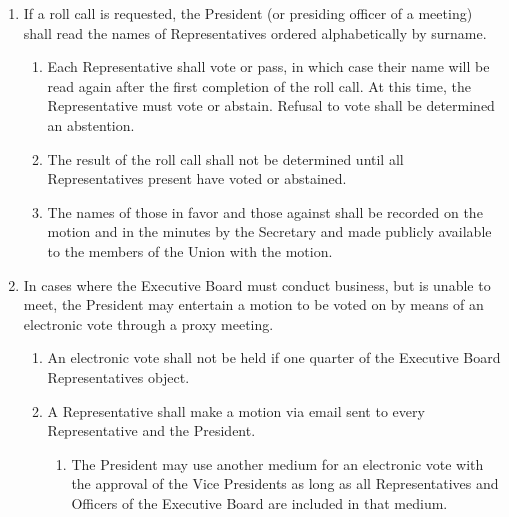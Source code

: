 \documentclass{uniondoc}
\begin{document}
\begin{enumerate}
  \begin{enumerate}
  \item Once all votes have been tallied, the President (or presiding officer of a meeting) will announce the result of the vote.
  \item In the case of a tie, the President (or presiding officer of a meeting) shall announce their vote, or their decision to abstain, and then the outcome of the vote.
  \item The vote count on any motion shall be recorded on the motion, and in the minutes by the Secretary, and it shall be made publicly available to the members of the Union with the motion.
  \end{enumerate}
\item If a roll call is requested, the President (or presiding officer of a meeting) shall read the names of Representatives ordered alphabetically by surname.
  \begin{enumerate}
  \item Each Representative shall vote or pass, in which case their name will be read again after the first completion of the roll call. At this time, the Representative must vote or abstain. Refusal to vote shall be determined an abstention.
  \item The result of the roll call shall not be determined until all Representatives present have voted or abstained.
  \item The names of those in favor and those against shall be recorded on the motion and in the minutes by the Secretary and made publicly available to the members of the Union with the motion.
  \end{enumerate}
\item In cases where the Executive Board must conduct business, but is unable to meet, the President may entertain a motion to be voted on by means of an electronic vote through a proxy meeting.
  \begin{enumerate}
  \item An electronic vote shall not be held if one quarter of the Executive Board Representatives object.
  \item A Representative shall make a motion via email sent to every Representative and the President.
    \begin{enumerate}
    \item The President may use another medium for an electronic vote with the approval of the Vice Presidents as long as all Representatives and Officers of the Executive Board are included in that medium.

\end{enumerate}
\end{enumerate}
\end{enumerate}
\end{document}
